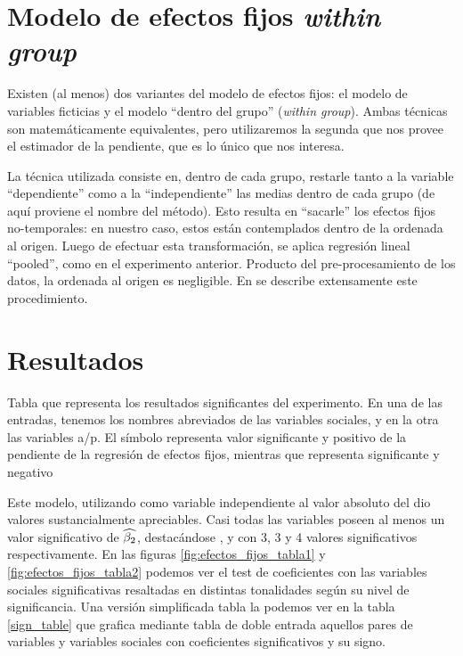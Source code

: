 \section{Modelo de efectos fijos \emph{within group}}

Existen (al menos) dos variantes del modelo de efectos fijos: el modelo de variables ficticias y el modelo ``dentro del grupo'' (\emph{within group}). Ambas técnicas son matemáticamente equivalentes, pero utilizaremos la segunda que nos provee el estimador de la pendiente, que es lo único que nos interesa.

La técnica utilizada consiste en, dentro de cada grupo, restarle tanto a la variable ``dependiente'' como a la ``independiente'' las medias dentro de cada grupo (de aquí proviene el nombre del método). Esto resulta en ``sacarle'' los efectos fijos no-temporales: en nuestro caso, estos están contemplados dentro de la ordenada al origen. Luego de efectuar esta transformación, se aplica regresión lineal ``pooled'', como en el experimento anterior. Producto del pre-procesamiento de los datos, la ordenada al origen es negligible. En \cite[chap 16]{gujarati1999} se describe extensamente este procedimiento.


\section{Resultados}


\begin{table}[t!]

\caption{Tabla que representa los resultados significantes del experimento. En una de las entradas, tenemos los nombres abreviados de las variables sociales, y en la otra las variables a/p. El símbolo \psl representa valor significante y positivo de la pendiente de la regresión de efectos fijos, mientras que \nsl representa significante y negativo }
\label{sign_table}
\end{table}

Este modelo, utilizando como variable independiente al valor absoluto del \entrainment dio valores sustancialmente apreciables. Casi todas las variables \ap poseen al menos un valor significativo de $\widehat{\beta_2}$, destacándose \ENGMEAN, \NOISETOHARMONICS y \FOMEAN  con 3, 3 y 4 valores significativos respectivamente. En las figuras \ref{fig:efectos_fijos_tabla1} y \ref{fig:efectos_fijos_tabla2} podemos ver el test de coeficientes con las variables sociales significativas resaltadas en distintas tonalidades según su nivel de significancia. Una versión simplificada tabla la podemos ver en la tabla \ref{sign_table} que grafica mediante tabla de doble entrada aquellos pares de variables \ap y variables sociales con coeficientes significativos y su signo.

